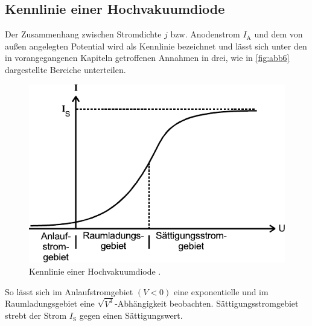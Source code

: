 \subsection{Kennlinie einer Hochvakuumdiode}

Der Zusammenhang zwischen Stromdichte $j$ bzw. Anodenstrom $I_\text{A}$
und dem von außen angelegten Potential wird als Kennlinie bezeichnet und lässt sich unter
den in vorangegangenen Kapiteln getroffenen Annahmen in drei, wie in \autoref{fig:abb6}
dargestellte Bereiche unterteilen.

\begin{figure}[H]
    \centering
    \includegraphics{figures/Abb6.pdf}
    \caption{Kennlinie einer Hochvakuumdiode \cite{ap09}.}
    \label{fig:abb6}
\end{figure}

So lässt sich im Anlaufstromgebiet $(V < 0)$ eine exponentielle und
im Raumladungsgebiet eine $\sqrt{V^3}$-Abhängigkeit beobachten.
Sättigungsstromgebiet strebt der Strom $I_\text{S}$ gegen einen
Sättigungswert.




